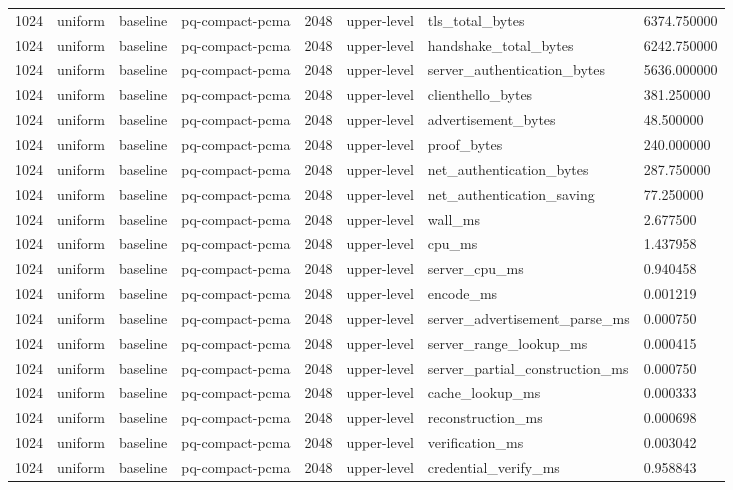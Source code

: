 \begin{tabular}{llllllll}
1024 & uniform & baseline & pq-compact-pcma & 2048 & upper-level & tls\_total\_bytes & 6374.750000 \\
1024 & uniform & baseline & pq-compact-pcma & 2048 & upper-level & handshake\_total\_bytes & 6242.750000 \\
1024 & uniform & baseline & pq-compact-pcma & 2048 & upper-level & server\_authentication\_bytes & 5636.000000 \\
1024 & uniform & baseline & pq-compact-pcma & 2048 & upper-level & clienthello\_bytes & 381.250000 \\
1024 & uniform & baseline & pq-compact-pcma & 2048 & upper-level & advertisement\_bytes & 48.500000 \\
1024 & uniform & baseline & pq-compact-pcma & 2048 & upper-level & proof\_bytes & 240.000000 \\
1024 & uniform & baseline & pq-compact-pcma & 2048 & upper-level & net\_authentication\_bytes & 287.750000 \\
1024 & uniform & baseline & pq-compact-pcma & 2048 & upper-level & net\_authentication\_saving & 77.250000 \\
1024 & uniform & baseline & pq-compact-pcma & 2048 & upper-level & wall\_ms & 2.677500 \\
1024 & uniform & baseline & pq-compact-pcma & 2048 & upper-level & cpu\_ms & 1.437958 \\
1024 & uniform & baseline & pq-compact-pcma & 2048 & upper-level & server\_cpu\_ms & 0.940458 \\
1024 & uniform & baseline & pq-compact-pcma & 2048 & upper-level & encode\_ms & 0.001219 \\
1024 & uniform & baseline & pq-compact-pcma & 2048 & upper-level & server\_advertisement\_parse\_ms & 0.000750 \\
1024 & uniform & baseline & pq-compact-pcma & 2048 & upper-level & server\_range\_lookup\_ms & 0.000415 \\
1024 & uniform & baseline & pq-compact-pcma & 2048 & upper-level & server\_partial\_construction\_ms & 0.000750 \\
1024 & uniform & baseline & pq-compact-pcma & 2048 & upper-level & cache\_lookup\_ms & 0.000333 \\
1024 & uniform & baseline & pq-compact-pcma & 2048 & upper-level & reconstruction\_ms & 0.000698 \\
1024 & uniform & baseline & pq-compact-pcma & 2048 & upper-level & verification\_ms & 0.003042 \\
1024 & uniform & baseline & pq-compact-pcma & 2048 & upper-level & credential\_verify\_ms & 0.958843 \\

\end{tabular}
